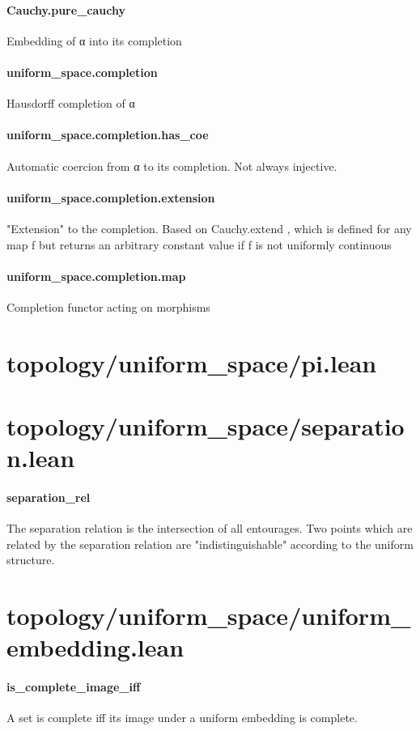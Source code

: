 \documentclass{article}
\begin{document}
\paragraph{Cauchy.pure\_cauchy}
\par
Embedding of 
\colorbox[RGB]{253,246,227}{{{{\color[RGB]{101, 123, 131} α }}}} into its completion
\paragraph{uniform\_space.completion}
\par
Hausdorff completion of 
\colorbox[RGB]{253,246,227}{{{{\color[RGB]{101, 123, 131} α }}}}\paragraph{uniform\_space.completion.has\_coe}
\par
Automatic coercion from 
\colorbox[RGB]{253,246,227}{{{{\color[RGB]{101, 123, 131} α }}}} to its completion. Not always injective.
\paragraph{uniform\_space.completion.extension}
\par
"Extension" to the completion. Based on 
\colorbox[RGB]{253,246,227}{{{{\color[RGB]{101, 123, 131} Cauchy.extend }}}}, which is defined for any map 
\colorbox[RGB]{253,246,227}{{{{\color[RGB]{101, 123, 131} f }}}} but
returns an arbitrary constant value if 
\colorbox[RGB]{253,246,227}{{{{\color[RGB]{101, 123, 131} f }}}} is not uniformly continuous
\paragraph{uniform\_space.completion.map}
\par
Completion functor acting on morphisms
\section{topology/uniform\_space/pi.lean}\section{topology/uniform\_space/separation.lean}\paragraph{separation\_rel}
\par
The separation relation is the intersection of all entourages.
Two points which are related by the separation relation are "indistinguishable"
according to the uniform structure.
\section{topology/uniform\_space/uniform\_embedding.lean}\paragraph{is\_complete\_image\_iff}
\par
A set is complete iff its image under a uniform embedding is complete.
\end{document}
